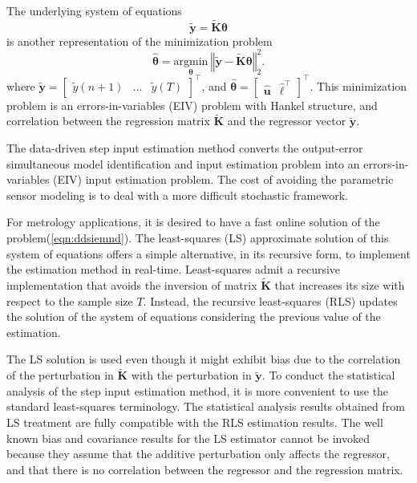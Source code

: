 The underlying system of equations 
\begin{equation} \widetilde{\mathbf{y}} = \widetilde{\mathbf{K}} \bm{\theta} \label{eqn:ddsiemnd} \end{equation}
is another representation of the minimization problem
\begin{equation} \widehat{\bm{\theta}} = \underset{\bm{\theta}}{\mathrm{argmin}} \ \left\Vert  \widetilde{\mathbf{y}} - \widetilde{\mathbf{K}} \bm{\theta} \right\Vert^2_2 . \label{eqn:min_seiv} \end{equation}
where $\widetilde{\mathbf{y}} = \begin{bmatrix} \widetilde{y}(n+1) & \ldots & \widetilde{y}(T) \end{bmatrix}^\top$, and
$\widehat{\bm{\theta}} = \begin{bmatrix} \widehat{\mathbf{u}} & \widehat{\bm{\ell}}^\top \end{bmatrix}^\top$. 
This minimization problem is an errors-in-variables (EIV) problem with Hankel structure, and correlation between the regression matrix $\widetilde{\mathbf{K}}$ and the regressor vector $\widetilde{\mathbf{y}}$.

The data-driven step input estimation method converts the output-error simultaneous model identification and input estimation problem into an errors-in-variables (EIV) input estimation problem.
The cost of avoiding the parametric sensor modeling is to deal with a more difficult stochastic framework.

For metrology applications, it is desired to have a fast online solution of the problem(\ref{eqn:ddsiemnd}).
The least-squares (LS) approximate solution of this system of equations offers a simple alternative, in its recursive form, to implement the estimation method in real-time.
Least-squares admit a recursive implementation that avoids the inversion of matrix $\widetilde{\mathbf{K}}$ that increases its size with respect to the sample size $T$.
Instead, the recursive least-squares (RLS) updates the solution of the system of equations considering the previous value of the estimation.

The LS solution is used even though it might exhibit bias due to the correlation of the perturbation in $\widetilde{\mathbf{K}}$ with the perturbation in $\widetilde{\mathbf{y}}$.
To conduct the statistical analysis of the step input estimation method, it is more convenient to use the standard least-squares terminology.
The statistical analysis results obtained from LS treatment are fully compatible with the RLS estimation results.
The well known bias and covariance results for the LS estimator cannot be invoked because they assume that the additive perturbation only affects the regressor, and that there is no correlation between the regressor and the regression matrix.






